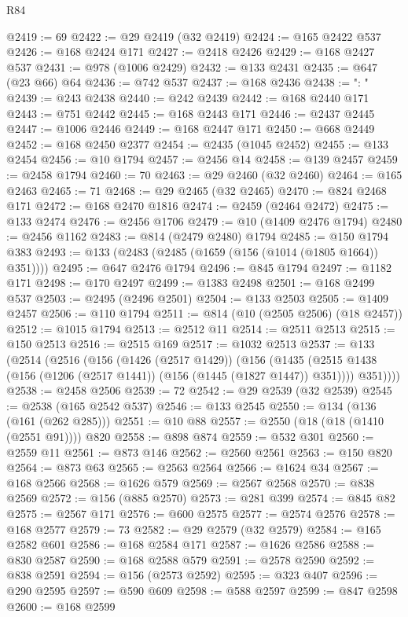 \begin{lexlean}{R84}
\begin{coremodule}
@2419 := 69
@2422 := @29 @2419 (@32 @2419)
@2424 := @165 @2422 @537
@2426 := @168 @2424 @171
@2427 := @2418 @2426
@2429 := @168 @2427 @537
@2431 := @978 (@1006 @2429)
@2432 := @133 @2431
@2435 := @647 (@23 @66) @64
@2436 := @742 @537
@2437 := @168 @2436
@2438 := ": "
@2439 := @243 @2438
@2440 := @242 @2439
@2442 := @168 @2440 @171
@2443 := @751 @2442
@2445 := @168 @2443 @171
@2446 := @2437 @2445
@2447 := @1006 @2446
@2449 := @168 @2447 @171
@2450 := @668 @2449
@2452 := @168 @2450 @2377
@2454 := @2435 (@1045 @2452)
@2455 := @133 @2454
@2456 := @10 @1794
@2457 := @2456 @14
@2458 := @139 @2457
@2459 := @2458 @1794
@2460 := 70
@2463 := @29 @2460 (@32 @2460)
@2464 := @165 @2463
@2465 := 71
@2468 := @29 @2465 (@32 @2465)
@2470 := @824 @2468 @171
@2472 := @168 @2470 @1816
@2474 := @2459 (@2464 @2472)
@2475 := @133 @2474
@2476 := @2456 @1706
@2479 := @10 (@1409 @2476 @1794)
@2480 := @2456 @1162
@2483 := @814 (@2479 @2480) @1794
@2485 := @150 @1794 @383
@2493 := @133 (@2483 (@2485 (@1659 (@156 (@1014 (@1805 @1664)) @351))))
@2495 := @647 @2476 @1794
@2496 := @845 @1794
@2497 := @1182 @171
@2498 := @170 @2497
@2499 := @1383 @2498
@2501 := @168 @2499 @537
@2503 := @2495 (@2496 @2501)
@2504 := @133 @2503
@2505 := @1409 @2457
@2506 := @110 @1794
@2511 := @814 (@10 (@2505 @2506) (@18 @2457))
@2512 := @1015 @1794
@2513 := @2512 @11
@2514 := @2511 @2513
@2515 := @150 @2513
@2516 := @2515 @169
@2517 := @1032 @2513
@2537 := @133
    (@2514
      (@2516
        (@156
          (@1426 (@2517 @1429))
          (@156
            (@1435 (@2515 @1438 (@156 (@1206 (@2517 @1441)) (@156 (@1445 (@1827 @1447)) @351))))
            @351))))
@2538 := @2458 @2506
@2539 := 72
@2542 := @29 @2539 (@32 @2539)
@2545 := @2538 (@165 @2542 @537)
@2546 := @133 @2545
@2550 := @134 (@136 (@161 (@262 @285)))
@2551 := @10 @88
@2557 := @2550 (@18 (@18 (@1410 (@2551 @91)))) @820
@2558 := @898 @874
@2559 := @532 @301
@2560 := @2559 @11
@2561 := @873 @146
@2562 := @2560 @2561
@2563 := @150 @820
@2564 := @873 @63
@2565 := @2563 @2564
@2566 := @1624 @34
@2567 := @168 @2566
@2568 := @1626 @579
@2569 := @2567 @2568
@2570 := @838 @2569
@2572 := @156 (@885 @2570)
@2573 := @281 @399
@2574 := @845 @82
@2575 := @2567 @171
@2576 := @600 @2575
@2577 := @2574 @2576
@2578 := @168 @2577
@2579 := 73
@2582 := @29 @2579 (@32 @2579)
@2584 := @165 @2582 @601
@2586 := @168 @2584 @171
@2587 := @1626 @2586
@2588 := @830 @2587
@2590 := @168 @2588 @579
@2591 := @2578 @2590
@2592 := @838 @2591
@2594 := @156 (@2573 @2592)
@2595 := @323 @407
@2596 := @290 @2595
@2597 := @590 @609
@2598 := @588 @2597
@2599 := @847 @2598
@2600 := @168 @2599

\end{coremodule}
\end{lexlean}
